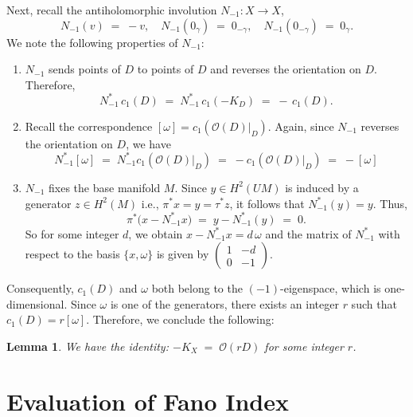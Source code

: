 \documentclass[a4paper, 12pt]{article}
\newcommand{\oX}{X}
\newcommand{\cO}{\mathcal{O}}
\newtheorem{lem}[thm]{Lemma}
\begin{document}
Next, recall the antiholomorphic involution \(N_{-1}:\oX\rightarrow\oX\),
\[
N_{-1}(v)\;=\;-v,\quad
N_{-1}(0_\gamma)\;=\;0_{-\gamma},\quad
N_{-1}(0_{-\gamma})\;=\;0_\gamma.
\]
We note the following properties of \(N_{-1}\):
\begin{enumerate}
\item 
\(N_{-1}\) sends points of \(D\) to points of \(D\) and reverses the orientation on \(D\). Therefore,
\[
N_{-1}^*\,c_1(D)
\;=\;
N_{-1}^*\,c_1(-K_D)
\;=\;
-\,c_1(D).
\]


\item
Recall the correspondence $[\omega]=c_1(\cO(D)|_D)$. Again, since $N_{-1}$ reverses the orientation on $D$, we have
\[
N_{-1}^*[\omega]
\;=\;
N_{-1}^*c_1(\cO(D)|_D)
\;=\;
-c_1(\cO(D)|_D)
\;=\;
-[\omega]
\]

\item 
\(N_{-1}\) fixes the base manifold \(M\). Since \(y\in H^2(UM)\) is induced by a generator \(z\in H^2(M)\) i.e., $\pi^*x=y=\tau^*z$, it follows that \(N_{-1}^*(y)=y\). Thus,
\[
\pi^*\!\bigl(x - N_{-1}^*x\bigr)
\;=\;
y - N_{-1}^*(y)
\;=\;
0.
\]
So for some integer \(d\), we obtain \(x - N_{-1}^*x = d\,\omega\) and the matrix of $N_{-1}^*$ with respect to the basis $\{x, \omega\}$ is given by $
\left(\begin{array}{cc}
    1&-d\\
    0&-1
\end{array}
\right).
$
\end{enumerate}
Consequently, \(c_1(D)\) and \(\omega\) both belong to the \((-1)\)-eigenspace, which is one-dimensional. Since \(\omega\) is one of the generators, there exists an integer \(r\) such that $c_1(D)=r[\omega]$. Therefore, we conclude the following:

\begin{lem}\label{lem-Fano}
\label{fano}
We have the identity:
$-K_{\oX} \;=\;\cO(rD)$  for some integer $r$.
\end{lem}

\section{Evaluation of Fano Index}
\end{document}
